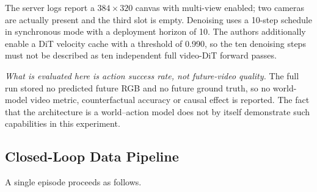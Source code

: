 The server logs report a $384 \times 320$ canvas with multi-view enabled; two
cameras are actually present and the third slot is empty. Denoising uses a
10-step schedule in synchronous mode with a deployment horizon of 10. The
authors additionally enable a DiT velocity cache with a threshold of 0.990, so
the ten denoising steps must not be described as ten independent full video-DiT
forward passes.

\emph{What is evaluated here is action success rate, not future-video quality.}
The full run stored no predicted future RGB and no future ground truth, so no
world-model video metric, counterfactual accuracy or causal effect is reported.
The fact that the architecture is a world--action model does not by itself
demonstrate such capabilities in this experiment.

\subsection{Closed-Loop Data Pipeline}
\label{sec:owa-pipeline}

A single episode proceeds as follows.

